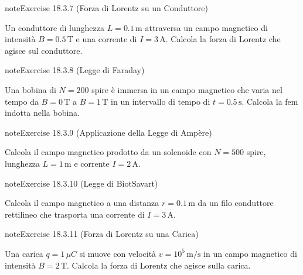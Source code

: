 \documentclass[letterpaper,10pt,italian]{jupyterBook}
\begin{document}
\begin{sphinxadmonition}{note}{Exercise 18.3.7 (Forza di Lorentz su un Conduttore)}



\sphinxAtStartPar
Un conduttore di lunghezza \(L = 0.1 \, \text{m}\) attraversa un campo magnetico di intensità \(B = 0.5 \, \text{T}\) e una corrente di \(I = 3 \, \text{A}\). Calcola la forza di Lorentz che agisce sul conduttore.
\end{sphinxadmonition}
 \label{exercise:ch/electromagnetism/electromagnetism-steady-problems-exercise-7}

\begin{sphinxadmonition}{note}{Exercise 18.3.8 (Legge di Faraday)}



\sphinxAtStartPar
Una bobina di \(N = 200\) spire è immersa in un campo magnetico che varia nel tempo da \(B = 0 \, \text{T}\) a \(B = 1 \, \text{T}\) in un intervallo di tempo di \(t = 0.5 \, \text{s}\). Calcola la fem indotta nella bobina.
\end{sphinxadmonition}
 \label{exercise:ch/electromagnetism/electromagnetism-steady-problems-exercise-8}

\begin{sphinxadmonition}{note}{Exercise 18.3.9 (Applicazione della Legge di Ampère)}



\sphinxAtStartPar
Calcola il campo magnetico prodotto da un solenoide con \(N = 500\) spire, lunghezza \(L = 1 \, \text{m}\) e corrente \(I = 2 \, \text{A}\).
\end{sphinxadmonition}
 \label{exercise:ch/electromagnetism/electromagnetism-steady-problems-exercise-9}

\begin{sphinxadmonition}{note}{Exercise 18.3.10 (Legge di Biot\sphinxhyphen{}Savart)}



\sphinxAtStartPar
Calcola il campo magnetico a una distanza \(r = 0.1 \, \text{m}\) da un filo conduttore rettilineo che trasporta una corrente di \(I = 3 \, \text{A}\).
\end{sphinxadmonition}
 \label{exercise:ch/electromagnetism/electromagnetism-steady-problems-exercise-10}

\begin{sphinxadmonition}{note}{Exercise 18.3.11 (Forza di Lorentz su una Carica)}



\sphinxAtStartPar
Una carica \(q = 1 \, \mu C\) si muove con velocità \(v = 10^5 \, \text{m/s}\) in un campo magnetico di intensità \(B = 2 \, \text{T}\). Calcola la forza di Lorentz che agisce sulla carica.
\end{sphinxadmonition}
 \label{exercise:ch/electromagnetism/electromagnetism-steady-problems-exercise-11}
\end{document}
